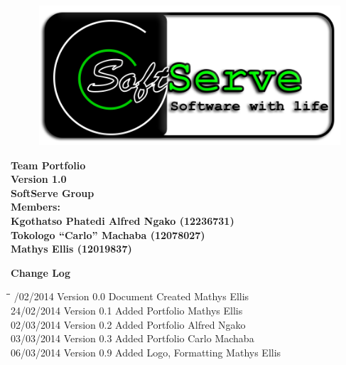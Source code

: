 \documentclass[12pt]{article}
\newcommand{\Title}{Team Portfolio} %
\begin{document}
	\begin{center}%
		\begin{figure}[ht!]
			\centering
			\includegraphics{./Pictures/logo.png}
		\end{figure}
		\LARGE \bf \Title \\
		{\bf Version 1.0}\\[4em]
		\LARGE {\bf SoftServe Group }\\[1em]
		\LARGE {\bf Members:}\\[2em]
		\large
		Kgothatso Phatedi Alfred Ngako		(12236731) \\[1em]
		Tokologo “Carlo” Machaba			(12078027) \\[1em]
		Mathys Ellis						(12019837) \\[8em]
			    
	\end{center}%
	
	\newpage
	{\LARGE \bf Change Log}\\[2em]	
		\begin{tabbing}
			\hspace*{3cm}\=\hspace*{3cm}\=\hspace*{8cm}\=\hspace*{3cm} /02/2014 \> Version 0.0 \> Document Created \> Mathys Ellis\\ 
			24/02/2014 \> Version 0.1 \> Added Portfolio \> Mathys Ellis\\
			02/03/2014 \> Version 0.2 \> Added Portfolio \> Alfred Ngako\\
			03/03/2014 \> Version 0.3 \> Added Portfolio \> Carlo Machaba\\
			06/03/2014 \> Version 0.9 \> Added Logo, Formatting \> Mathys Ellis\\
		\end{tabbing}
			
	\newpage
		\tableofcontents
			
	\newpage
\end{document}
